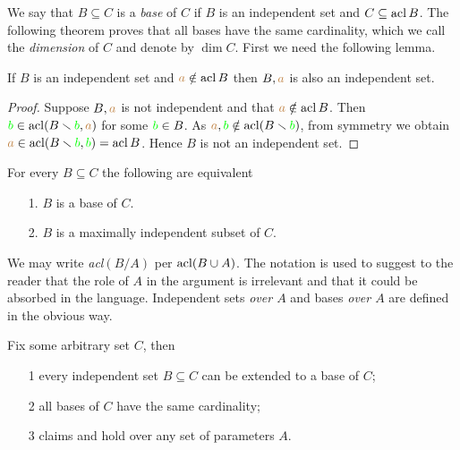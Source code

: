 % 

We say that $B\subseteq C$ is a \emph{base\/} of $C$ if $B$ is an independent set and $C\subseteq\mathop{\rm acl} B$. The following theorem proves that all bases have the same cardinality, which we call the  \emph{dimension\/} of $C$ and denote by \emph{$\dim C$}. First we need the following lemma.

\begin{lemma}\label{indipendenza+1}
If $B$ is an independent set and ${\color{brown} a}\notin \mathop{\rm acl} B$ then $B,{\color{brown} a}$ is also an independent set.
\end{lemma}
\begin{proof}
Suppose $B,{\color{brown} a}$ is not independent and that ${\color{brown} a}\notin \mathop{\rm acl} B$. Then ${\color{green} b}\in\mathop{\rm acl}(B\smallsetminus {\color{green}b},{\color{brown} a})$ for some ${\color{green} b}\in B$. As ${\color{brown} a},{\color{green} b}\notin\mathop{\rm acl}(B\smallsetminus {\color{green}b})$, from symmetry we obtain ${\color{brown} a}\in\mathop{\rm acl}(B\smallsetminus {\color{green}b},{\color{green} b})=\mathop{\rm acl} B$. Hence $B$ is not an independent set. 
\end{proof}

\begin{corollary}\label{basemassimale}
For every $B\subseteq C$ the following are equivalent
\begin{itemize}
\item[1.] $B$ is a base of $C$.
\item[2.] $B$ is a maximally independent subset of $C$.\QED
\end{itemize}
\end{corollary}

We may write \emph{acl$(B/A)$\/} per $\mathop{\rm acl}(B\cup A)$. The notation is used to suggest to the reader that the role of $A$ in the argument is irrelevant and that it could be absorbed in the language. Independent sets \emph{over $A$\/} and bases \emph{over $A$\/} are defined in the obvious way.

\begin{theorem} Fix some arbitrary set $C$, then
\begin{itemize}
\item[1] every independent set $B\subseteq C$ can be extended to a base of $C$;
\item[2] all bases of $C$ have the same cardinality;
\item[3] claims  and  hold over any set of parameters $A$.
\end{itemize}
\end{theorem}

